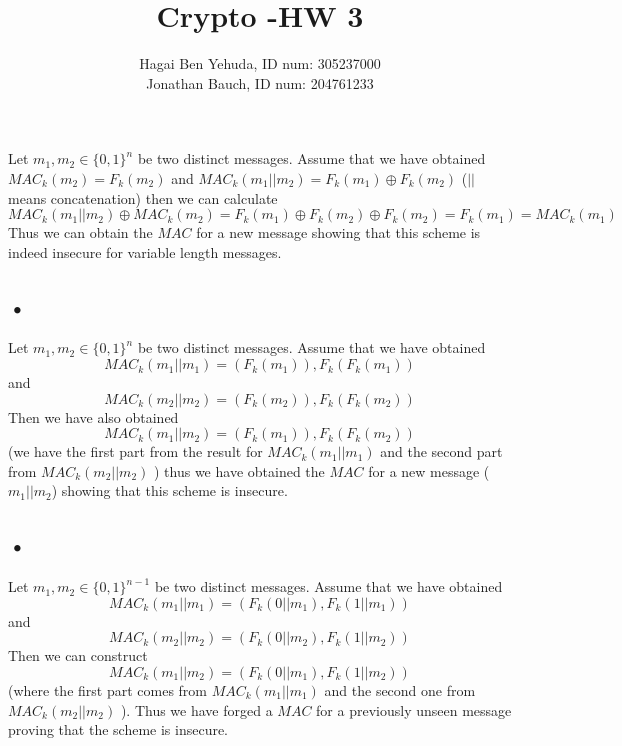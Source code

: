 \documentclass{article}
\title{Crypto -HW 3}
\author{Hagai Ben Yehuda, ID num: 305237000\\ Jonathan Bauch, ID num: 204761233}
\date{}
\begin{document}
  \maketitle

\section{}

\subsection{}

Let $m_1, m_2\in \{0,1\}^n$ be two distinct messages.
Assume that we have obtained $MAC_k(m_2 ) = F_k(m_2)$ and $MAC_k(m_1 || m_2 ) = F_k(m_1)\oplus F_k(m_2)$ ($||$ means concatenation) then we can calculate 
\[MAC_k(m_1 || m_2 )  \oplus MAC_k(m_2) = F_k(m_1) \oplus F_k(m_2) \oplus F_k(m_2) = F_k(m_1) = MAC_k(m_1)\]
Thus we can obtain the $MAC$ for a new message showing that this scheme is indeed insecure for variable length messages.

\subsection{•}
Let $m_1, m_2\in \{0,1\}^n$ be two distinct messages.
Assume that we have obtained \[MAC_k(m_1 || m_1) = (F_k(m_1)), F_k(F_k(m_1))\] and \[MAC_k(m_2 || m_2) = (F_k(m_2)), F_k(F_k(m_2))\]
Then we have also obtained \[MAC_k(m_1 || m_2) =  (F_k(m_1)), F_k(F_k(m_2))\] (we have the first part from the result for $MAC_k(m_1 || m_1) $ and the second part from $MAC_k(m_2 || m_2)$ ) thus we have obtained the $MAC$ for a new message ($m_1||m_2$) showing that this scheme is insecure.

\subsection{•}
Let $m_1, m_2\in \{0,1\}^{n-1}$ be two distinct messages.
Assume that we have obtained \[MAC_k(m_1 || m_1) = (F_k(0 ||m_1), F_k(1||m_1))\] and \[MAC_k(m_2 || m_2) = (F_k(0 ||m_2), F_k(1||m_2))\]
Then we can construct \[MAC_k(m_1||m_2) = (F_k(0 ||m_1), F_k(1||m_2))\] (where the first part comes from $MAC_k(m_1 || m_1)$ and the second one from $MAC_k(m_2 || m_2)$ ).
Thus we have forged a $MAC$ for a previously unseen message proving that the scheme is insecure.
\end{document}
